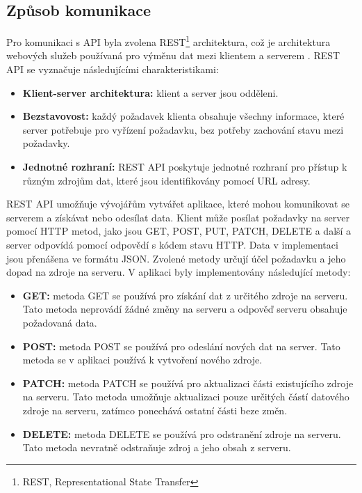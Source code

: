 \subsection{Způsob komunikace}


Pro komunikaci s API byla zvolena REST\footnote{REST, Representational State Transfer} architektura, což je architektura webových služeb používaná pro výměnu dat mezi klientem a serverem \cite{rest}. REST API se vyznačuje následujícími charakteristikami:

\begin{itemize}
  \item \textbf{Klient-server architektura:} klient a server jsou odděleni.
  \item \textbf{Bezstavovost:} každý požadavek klienta obsahuje všechny informace, které server potřebuje pro vyřízení požadavku, bez potřeby zachování stavu mezi požadavky.
  \item \textbf{Jednotné rozhraní:} REST API poskytuje jednotné rozhraní pro přístup k různým zdrojům dat, které jsou identifikovány pomocí URL adresy.
\end{itemize}

REST API umožňuje vývojářům vytvářet aplikace, které mohou komunikovat se serverem a získávat nebo odesílat data.
Klient může posílat požadavky na server pomocí HTTP metod, jako jsou GET, POST, PUT, PATCH, DELETE a další
a server odpovídá pomocí odpovědí s kódem stavu HTTP. Data v implementaci jsou přenášena ve formátu JSON. Zvolené metody
určují účel požadavku a jeho dopad na zdroje na serveru. V aplikaci byly implementovány následující metody:

\begin{itemize}
  \item \textbf{GET:} metoda GET se používá pro získání dat z určitého zdroje na serveru. Tato metoda neprovádí žádné změny na serveru a odpověď serveru obsahuje požadovaná data.
  \item \textbf{POST:} metoda POST se používá pro odeslání nových dat na server. Tato metoda se v aplikaci používá k vytvoření nového zdroje.
  \item \textbf{PATCH:} metoda PATCH se používá pro aktualizaci části existujícího zdroje na serveru. Tato metoda umožňuje aktualizaci pouze určitých částí datového zdroje na serveru, zatímco ponechává ostatní části beze změn.
  \item \textbf{DELETE:} metoda DELETE se používá pro odstranění zdroje na serveru. Tato metoda nevratně odstraňuje zdroj a jeho obsah z serveru.
\end{itemize}

